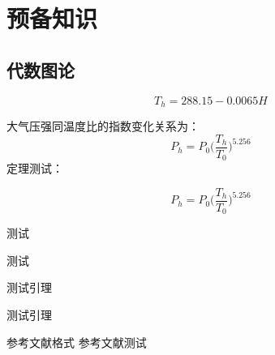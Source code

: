 \chapter{预备知识}
\section{代数图论}

\begin{equation}
T_h=288.15-0.0065H
\end{equation}

大气压强同温度比的指数变化关系为：
\begin{equation}
P_h=P_0\big(\frac{T_h}{T_0}\big)^{5.256}
\end{equation}
定理测试：
\begin{Theorem}

\begin{equation}
P_h=P_0\big(\frac{T_h}{T_0}\big)^{5.256}
\end{equation}
\end{Theorem}
\begin{Theorem}
测试
\end{Theorem}
\begin{Theorem}
测试
\end{Theorem}
\begin{Lemma}
测试引理
\end{Lemma}
\begin{Lemma}
测试引理
\end{Lemma}
参考文献格式
参考文献测试
